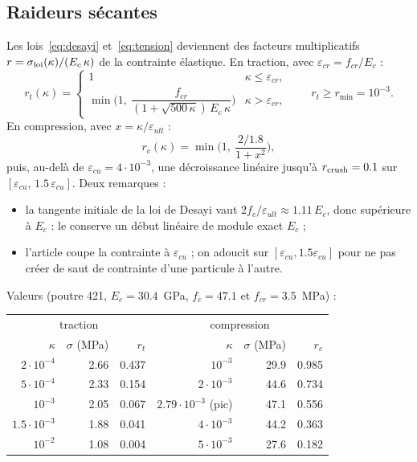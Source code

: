 \documentclass[11pt,a4paper]{article}
\newcommand{\code}[1]{\texttt{\detokenize{#1}}}
\begin{document}
\subsection{Raideurs sécantes}

Les lois~\eqref{eq:desayi} et~\eqref{eq:tension} deviennent des facteurs multiplicatifs
$r = \sigma_{\rm loi}(\kappa)/(E_c\,\kappa)$ de la contrainte élastique. En traction, avec
$\varepsilon_{cr} = f_{cr}/E_c$ :
\begin{equation}
  r_t(\kappa) =
  \begin{cases}
    1 & \kappa \le \varepsilon_{cr},\\[2pt]
    \min\!\Big(1,\ \dfrac{f_{cr}}{(1+\sqrt{500\,\kappa})\,E_c\,\kappa}\Big) & \kappa > \varepsilon_{cr},
  \end{cases}
  \qquad r_t \ge r_{\min} = 10^{-3}.
\end{equation}
En compression, avec $x = \kappa/\varepsilon_{ult}$ :
\begin{equation}
  r_c(\kappa) = \min\!\Big(1,\ \frac{2/1.8}{1 + x^2}\Big),
\end{equation}
puis, au-delà de $\varepsilon_{cu} = 4\cdot10^{-3}$, une décroissance linéaire jusqu'à
$r_{\rm crush} = 0.1$ sur $[\varepsilon_{cu},\,1.5\,\varepsilon_{cu}]$. Deux remarques :
\begin{itemize}
  \item la tangente initiale de la loi de Desayi vaut $2f_c/\varepsilon_{ult} \approx 1.11\,E_c$,
        donc supérieure à $E_c$ : le \code{min(1, ...)} conserve un début linéaire de module exact $E_c$ ;
  \item l'article coupe la contrainte à $\varepsilon_{cu}$ ; on adoucit sur $[\varepsilon_{cu}, 1.5\varepsilon_{cu}]$
        pour ne pas créer de saut de contrainte d'une particule à l'autre.
\end{itemize}
Valeurs (poutre 421, $E_c = 30.4$~GPa, $f_c = 47.1$ et $f_{cr} = 3.5$~MPa) :

\begin{center}
\begin{tabular}{@{}rrr@{\qquad}rrr@{}}
\toprule
\multicolumn{3}{c}{traction} & \multicolumn{3}{c}{compression} \\
$\kappa$ & $\sigma$ (MPa) & $r_t$ & $\kappa$ & $\sigma$ (MPa) & $r_c$ \\
\midrule
$2\cdot10^{-4}$ & 2.66 & 0.437 & $10^{-3}$ & 29.9 & 0.985 \\
$5\cdot10^{-4}$ & 2.33 & 0.154 & $2\cdot10^{-3}$ & 44.6 & 0.734 \\
$10^{-3}$ & 2.05 & 0.067 & $2.79\cdot10^{-3}$ (pic) & 47.1 & 0.556 \\
$1.5\cdot10^{-3}$ & 1.88 & 0.041 & $4\cdot10^{-3}$ & 44.2 & 0.363 \\
$10^{-2}$ & 1.08 & 0.004 & $5\cdot10^{-3}$ & 27.6 & 0.182 \\
\bottomrule
\end{tabular}
\end{center}
\end{document}

